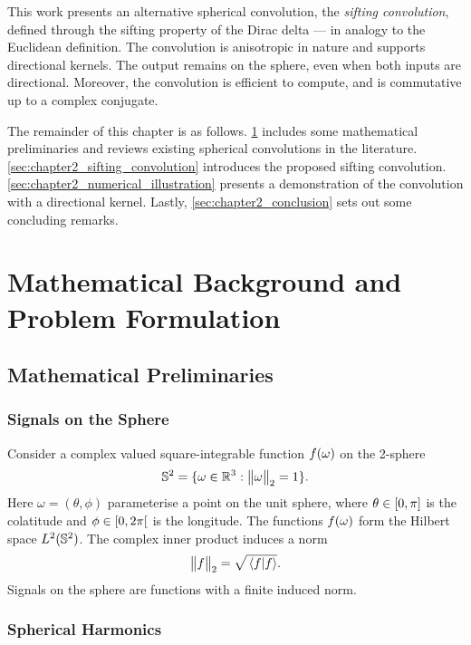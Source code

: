 This work presents an alternative spherical convolution, the \emph{sifting convolution}, defined through the sifting property of the Dirac delta --- in analogy to the Euclidean definition.
The convolution is anisotropic in nature and supports directional kernels.
The output remains on the sphere, even when both inputs are directional.
Moreover, the convolution is efficient to compute, and is commutative up to a complex conjugate.

The remainder of this chapter is as follows.
\cref{sec:chapter2_preliminaries} includes some mathematical preliminaries and reviews existing spherical convolutions in the literature.
\cref{sec:chapter2_sifting_convolution} introduces the proposed sifting convolution.
\cref{sec:chapter2_numerical_illustration} presents a demonstration of the convolution with a directional kernel.
Lastly, \cref{sec:chapter2_conclusion} sets out some concluding remarks.

\section{Mathematical Background and Problem Formulation}\label{sec:chapter2_preliminaries}

\subsection{Mathematical Preliminaries}

\subsubsection{Signals on the Sphere}

Consider a complex valued square-integrable function \(f(\omega)\) on the 2-sphere
%
\begin{equation}
	\mathbb{S}^{2}{}
	= \{\omega \in \mathbb{R}^{3} : {\big\lVert\omega\big\rVert}_{2} = 1\}.
\end{equation}
%
Here \(\omega=(\theta,\phi)\) parameterise a point on the unit sphere, where \(\theta \in \interval{0}{\pi}\) is the colatitude and \(\phi \in \interval[open right]{0}{2\pi}\) is the longitude.
The functions \(f(\omega)\) form the Hilbert space \(L^{2}(\mathbb{S}^{2})\).
The complex inner product induces a norm
%
\begin{equation}
	{\big\lVert f\big\rVert}_{2}
	= \sqrt{\braket*{f}}.
\end{equation}
%
Signals on the sphere are functions with a finite induced norm.

\subsubsection{Spherical Harmonics}

